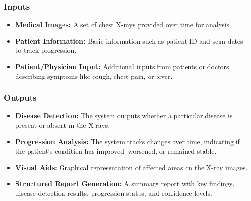 \documentclass{article}
\begin{document}
\subsubsection{Inputs}

\begin{itemize}
    \item \textbf{Medical Images:} A set of chest X-rays provided over time for analysis.
    \item \textbf{Patient Information:} Basic information such as patient ID and scan dates to track progression.
    \item \textbf{Patient/Physician Input:} Additional inputs from patients or doctors describing symptoms like cough, chest pain, or fever.
\end{itemize}

\subsubsection{Outputs}

\begin{itemize}
    \item \textbf{Disease Detection:} The system outputs whether a particular disease is present or absent in the X-rays.
    \item \textbf{Progression Analysis:} The system tracks changes over time, indicating if the patient’s condition has improved, worsened, or remained stable.
    \item \textbf{Visual Aids:} Graphical representation of affected areas on the X-ray images.
    \item \textbf{Structured Report Generation:} A summary report with key findings, disease detection results, progression status, and confidence levels.

\end{itemize}
\end{document}
